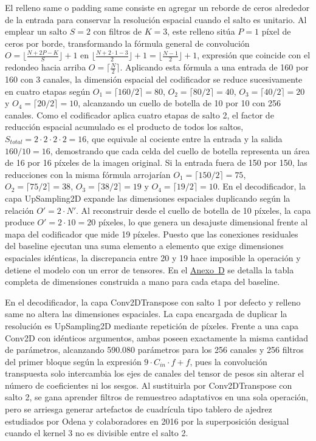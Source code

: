 \documentclass[10pt,letterpaper]{article}
\newcommand{\refanexo}[2]{\hyperref[#1]{Anexo~#2}}
\begin{document}
El relleno same o padding same consiste en agregar un reborde de ceros alrededor de la entrada para conservar la resolución espacial cuando el salto es unitario. Al emplear un salto $S = 2$ con filtros de $K = 3$, este relleno sitúa $P = 1$ píxel de ceros por borde, transformando la fórmula general de convolución $O = \lfloor \frac{N + 2P - K}{S} \rfloor + 1$ en $\lfloor \frac{N + 2 \cdot 1 - 3}{2} \rfloor + 1 = \lfloor \frac{N - 1}{2} \rfloor + 1$, expresión que coincide con el redondeo hacia arriba $O = \lceil \frac{N}{2} \rceil$. Aplicando esta fórmula a una entrada de 160 por 160 con 3 canales, la dimensión espacial del codificador se reduce sucesivamente en cuatro etapas según $O_1 = \lceil 160/2 \rceil = 80$, $O_2 = \lceil 80/2 \rceil = 40$, $O_3 = \lceil 40/2 \rceil = 20$ y $O_4 = \lceil 20/2 \rceil = 10$, alcanzando un cuello de botella de 10 por 10 con 256 canales. Como el codificador aplica cuatro etapas de salto 2, el factor de reducción espacial acumulado es el producto de todos los saltos, $S_{total} = 2 \cdot 2 \cdot 2 \cdot 2 = 16$, que equivale al cociente entre la entrada y la salida $160 / 10 = 16$, demostrando que cada celda del cuello de botella representa un área de 16 por 16 píxeles de la imagen original. Si la entrada fuera de 150 por 150, las reducciones con la misma fórmula arrojarían $O_1 = \lceil 150/2 \rceil = 75$, $O_2 = \lceil 75/2 \rceil = 38$, $O_3 = \lceil 38/2 \rceil = 19$ y $O_4 = \lceil 19/2 \rceil = 10$. En el decodificador, la capa UpSampling2D expande las dimensiones espaciales duplicando según la relación $O' = 2 \cdot N'$. Al reconstruir desde el cuello de botella de 10 píxeles, la capa produce $O' = 2 \cdot 10 = 20$ píxeles, lo que genera un desajuste dimensional frente al mapa del codificador que mide 19 píxeles. Puesto que las conexiones residuales del baseline ejecutan una suma elemento a elemento que exige dimensiones espaciales idénticas, la discrepancia entre 20 y 19 hace imposible la operación y detiene el modelo con un error de tensores. En el \refanexo{anexo_d}{D} se detalla la tabla completa de dimensiones construida a mano para cada etapa del baseline.

En el decodificador, la capa Conv2DTranspose con salto 1 por defecto y relleno same no altera las dimensiones espaciales. La capa encargada de duplicar la resolución es UpSampling2D mediante repetición de píxeles. Frente a una capa Conv2D con idénticos argumentos, ambas poseen exactamente la misma cantidad de parámetros, alcanzando 590.080 parámetros para los 256 canales y 256 filtros del primer bloque según la expresión $9 \cdot C_{in} \cdot f + f$, pues la convolución transpuesta solo intercambia los ejes de canales del tensor de pesos sin alterar el número de coeficientes ni los sesgos. Al sustituirla por Conv2DTranspose con salto 2, se gana aprender filtros de remuestreo adaptativos en una sola operación, pero se arriesga generar artefactos de cuadrícula tipo tablero de ajedrez estudiados por Odena y colaboradores en 2016 por la superposición desigual cuando el kernel 3 no es divisible entre el salto 2.
\end{document}
